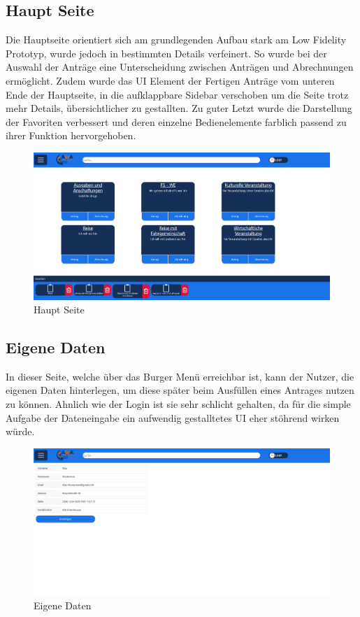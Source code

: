 \subsection{Haupt Seite}\label{Haupt Seite}
Die Hauptseite orientiert sich am grundlegenden Aufbau stark am Low Fidelity Prototyp, 
wurde jedoch in bestimmten Details verfeinert. So wurde bei der Auswahl der Anträge eine 
Unterscheidung zwischen Anträgen und Abrechnungen ermöglicht. Zudem wurde das \ac{UI} 
Element der Fertigen Anträge vom unteren Ende der Hauptseite, in die aufklappbare Sidebar
verschoben um die Seite trotz mehr Details, übersichtlicher zu gestallten. Zu guter Letzt 
wurde die Darstellung der Favoriten verbessert und deren einzelne Bedienelemente farblich 
passend zu ihrer Funktion hervorgehoben.

\begin{figure}[h]
  \centering
    \includegraphics[width=1.0\textwidth]{Doc/images/Landing Page.png}
    \caption{Haupt Seite}\label{Hautp Seite}
\end{figure}

\subsection{Eigene Daten}\label{Eigene Daten}
In dieser Seite, welche über das Burger Menü erreichbar ist, kann der Nutzer, die eigenen 
Daten hinterlegen, um diese später beim Ausfüllen eines Antrages nutzen zu können. Ahnlich 
wie der Login ist sie sehr schlicht gehalten, da für die simple Aufgabe der Dateneingabe ein
aufwendig gestalltetes \ac{UI} eher stöhrend wirken würde.

\begin{figure}
  \centering
    \includegraphics[width=1.0\textwidth]{Doc/images/Own Data.png}
    \caption{Eigene Daten}\label{Eigene Daten}
\end{figure}

